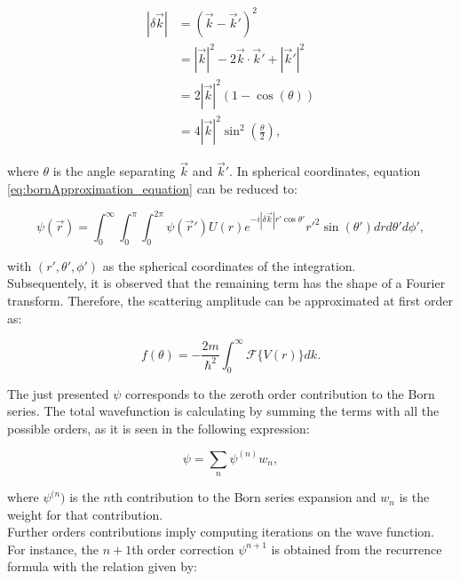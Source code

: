 \documentclass[openany]{book}
\begin{document}
\begin{equation} \label{eq:bornApproximation_waveNumber_difference}
	\begin{split}
	|\delta \vec k| &= (\vec k - \vec k')^2 \\
						   &= |\vec k|^2 - 2 \vec k \cdot  \vec k' + |\vec k'|^2 \\
						   &= 2|\vec k|^2(1 - \cos {(\theta)}) \\
						   &= 4 |\vec k|^2 \sin^2{\left(\frac{\theta}{2}\right)},
	\end{split}
\end{equation}

where $\theta$ is the angle separating $\vec k$ and $\vec k'$. In spherical coordinates, equation \ref{eq:bornApproximation_equation} can be reduced to:

\begin{equation} \label{eq:bornApproximation_equation_spherical}
	 	\psi(\vec r) = \int_{0}^{\infty} \int_{0}^{\pi} \int_{0}^{2\pi} { \psi(\vec r' )U(r)e^{-i|\delta \vec k|r'\cos \theta' } {r'}^{2}   \sin(\theta') dr d\theta' d\phi' },
\end{equation}

with $(r', \theta', \phi')$ as the spherical coordinates of the integration. \\
 
Subsequentely, it is observed that the remaining term has the shape of a Fourier transform. Therefore, the scattering amplitude can be approximated at first order as:

\begin{equation} \label{eq:bornApproximation_scatteringAmplitude}
	f(\theta) =   - \frac{2m}{\hbar^2} \int_{0}^{\infty} {\mathcal{F}\{V(r)\}dk}.
\end{equation}

The just presented  $\psi$ corresponds to the zeroth order contribution to the Born series. The total wavefunction is calculating by summing the terms with all the possible orders, as it is seen in the following expression: 

\begin{equation} \label{eq:bornApproximation_series}
	\psi = \sum_n{\psi^{(n)}w_n},
\end{equation}

where $\psi^{(n})$ is the $n$th contribution to the Born series expansion and $w_n$ is the weight for that contribution. \\

Further orders contributions imply computing iterations on the wave function. For instance, the $n+1$th order correction $\psi^{n+1}$ is obtained from the recurrence formula with the relation given by:
\end{document}
